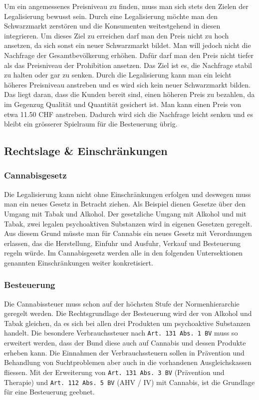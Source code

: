 \documentclass[../main.tex]{subfiles}
\begin{document}
	 Um ein angemessenes Preisniveau zu finden, muss man sich stets den Zielen der Legalisierung bewusst sein. 
	 Durch eine Legalisierung möchte man den Schwarzmarkt zerstören und die Konsumenten weitestgehend in diesen integrieren. 
	 Um dieses Ziel zu erreichen darf man den Preis nicht zu hoch ansetzen, da sich sonst ein neuer Schwarzmarkt bildet. 
	 Man will jedoch nicht die Nachfrage der Gesamtbevölkerung erhöhen. 
	 Dafür darf man den Preis nicht tiefer als das Preisniveau der Prohibition ansetzen. 
	 Das Ziel ist es, die Nachfrage stabil zu halten oder gar zu senken.
	 Durch die Legalisierung kann man ein leicht höheres Preisniveau anstreben und es wird sich kein neuer Schwarzmarkt bilden. 
	 Das liegt daran, dass die Kunden bereit sind, einen höheren Preis zu bezahlen, da im Gegenzug Qualität und Quantität gesichert ist. 
	 Man kann einen Preis von etwa 11.50 CHF anstreben. 
	 Dadurch wird sich die Nachfrage leicht senken und es bleibt ein grösserer Spielraum für die Besteuerung übrig.
	 
	 \subsection{Rechtslage \& Einschränkungen}
	 
	 \subsubsection{Cannabisgesetz}
	 Die Legalisierung kann nicht ohne Einschränkungen erfolgen und deswegen muss man ein neues Gesetz in Betracht ziehen.
	 Als Beispiel dienen Gesetze über den Umgang mit Tabak und Alkohol.
	 Der gesetzliche Umgang mit Alkohol und mit Tabak, zwei legalen psychoaktiven Substanzen wird in eigenen Gesetzen geregelt. 
	 Aus diesem Grund müsste man für Cannabis ein neues Gesetz mit Verordnungen erlassen, das die Herstellung, Einfuhr und Ausfuhr, Verkauf und Besteuerung regeln würde.	 
	 Im Cannabisgesetz werden alle in den folgenden Untersektionen genannten Einschränkungen weiter konkretisiert.
	 
	 \subsubsection{Besteuerung}
	 Die Cannabissteuer muss schon auf der höchsten Stufe der Normenhierarchie geregelt werden. 
	 Die Rechtsgrundlage der Besteuerung wird der von Alkohol und Tabak gleichen, da es sich bei allen drei Produkten um psychoaktive Substanzen handelt.
	 Die besondere Verbrauchssteuer nach \texttt{Art. 131 Abs. 1 BV} muss so erweitert werden, dass der Bund diese auch auf Cannabis und dessen Produkte erheben kann.
	 Die Einnahmen der Verbrauchssteuern sollen in Prävention und Behandlung von Suchtproblemen aber auch in die vorhandenen Ausgleichskassen fliessen.
	 Mit der Erweiterung von \texttt{Art. 131 Abs. 3 BV} (Prävention und Therapie) und \texttt{Art. 112 Abs. 5 BV} (AHV / IV) mit Cannabis, ist die Grundlage für eine Besteuerung geebnet.\\
	 
\end{document}

